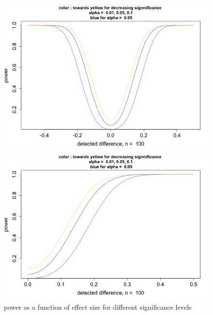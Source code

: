 \documentclass[14pt]{article}
\begin{document}
\begin{figure}[h!]
\centering
\begin{minipage}{0.4\textwidth}
\includegraphics[scale=0.2]{plots/plot_power colore alfa 1.jpg}  
\end{minipage}
\begin{minipage}{0.4\textwidth}
\includegraphics[scale=0.2]{plots/plot_power colore alfa 2.jpg}  
\end{minipage}
\caption{power as a function of effect size for different significance levels}
\label{fig:power}
\end{figure}
\end{document}
